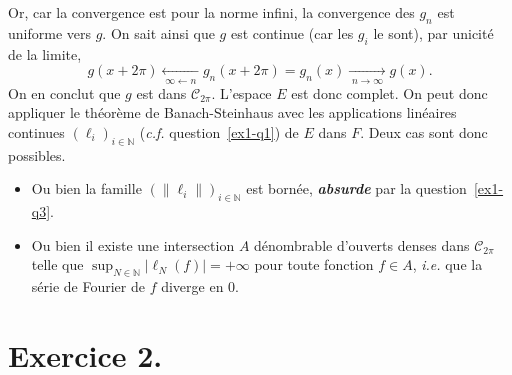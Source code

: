 \documentclass{../../td}
\begin{document}
\begin{enumerate}
      Or, car la convergence est pour la norme infini, la convergence des $g_n$ est uniforme vers $g$.
      On sait ainsi que $g$ est continue (car les $g_i$ le sont), par unicité de la limite,
      \[
        g(x + 2\pi) \xleftarrow[\;\infty\gets n\;]{} g_n(x + 2\pi) = g_n(x) \xrightarrow[\;n\to \infty\;]{} g(x)
      .\]
      On en conclut que $g$ est dans $\mathcal{C}_{2\pi}$. L'espace $E$ est donc complet.
      On peut donc appliquer le théorème de Banach-Steinhaus avec les applications linéaires continues $(\ell_i)_{i \in \mathds{N}}$ (\textit{c.f.} question~\ref{ex1-q1}) de $E$ dans $F$.
      Deux cas sont donc possibles.
      \begin{itemize}
        \item Ou bien la famille $(\|\ell_i\|)_{i \in \mathds{N}}$ est bornée, \textit{\textbf{absurde}} par la question~\ref{ex1-q3}.
        \item Ou bien il existe une intersection $A$ dénombrable d'ouverts denses dans $\mathcal{C}_{2\pi}$ telle que $\sup_{N \in \mathds{N}} |\ell_N(f)| = +\infty$ pour toute fonction $f \in A$, \textit{i.e.} que la série de Fourier de $f$ diverge en $0$.
      \end{itemize}
  \end{enumerate}

  \chapter*{Exercice 2.}
\end{document}
